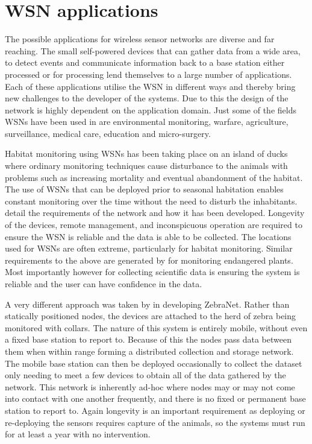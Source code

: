 \documentclass[authoryearcitations]{UoYCSproject}
\begin{document}
\section{WSN applications}


The possible applications for wireless sensor networks are diverse and far reaching. The small self-powered devices that can gather data from a wide area, to detect events and communicate information back to a base station either processed or for processing lend themselves to a large number of applications. Each of these applications utilise the WSN in different ways and thereby bring new challenges to the developer of the systems. Due to this the design of the network is highly dependent on the application domain. Just some of the fields WSNs have been used in are environmental monitoring, warfare, agriculture, surveillance, medical care, education and micro-surgery.

Habitat monitoring using WSNs has been taking place on an island of ducks where ordinary monitoring techniques cause disturbance to the animals with problems such as increasing mortality and eventual abandonment of the habitat. The use of WSNs that can be deployed prior to seasonal habitation enables constant monitoring over the time without the need to disturb the inhabitants. \citet{Mainwaring2002} detail the requirements of the network and how it has been developed. Longevity of the devices, remote management, and inconspicuous operation are required to ensure the WSN is reliable and the data is able to be collected. The locations used for WSNs are often extreme, particularly for habitat monitoring. Similar requirements to the above are generated by \citet{Biagioni2002} for monitoring endangered plants. Most importantly however for collecting scientific data is ensuring the system is reliable and the user can have confidence in the data.


A very different approach was taken by \citet{Juang2002} in developing ZebraNet. Rather than statically positioned nodes, the devices are attached to the herd of zebra being monitored with collars. The nature of this system is entirely mobile, without even a fixed base station to report to. Because of this the nodes pass data between them when within range forming a distributed collection and storage network. The mobile base station can then be deployed occasionally to collect the dataset only needing to meet a few devices to obtain all of the data gathered by the network. This network is inherently ad-hoc where nodes may or may not come into contact with one another frequently, and there is no fixed or permanent base station to report to. Again longevity is an important requirement as deploying or re-deploying the sensors requires capture of the animals, so the systems must run for at least a year with no intervention.
\end{document}
